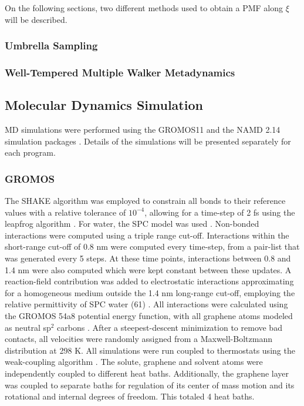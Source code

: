 \documentclass[twoside,twocolumn,9pt]{article}
\begin{document}
On the following sections, two different methods used to obtain a PMF along $\xi$ will be described.

\subsubsection{Umbrella Sampling}

\subsubsection{Well-Tempered Multiple Walker Metadynamics}

\subsection{Molecular Dynamics Simulation}

MD simulations were performed using the GROMOS11 \cite{Riniker_2011,
  Schmid_2012} and the NAMD 2.14 simulation packages
\cite{Phillips_2020}.  Details of the simulations will be presented
separately for each program.

\subsubsection{GROMOS}

The SHAKE algorithm \cite{Ryckaert_1977} was employed to constrain all
bonds to their reference values with a relative tolerance of
$10^{-4}$, allowing for a time-step of 2 fs using the leapfrog
algorithm \cite{Hockney_1977}.  For water, the SPC model was used
\cite{Berendsen_1981}.  Non-bonded interactions were computed using a
triple range cut-off. Interactions within the short-range cut-off of
0.8 nm were computed every time-step, from a pair-list that was
generated every 5 steps.  At these time points, interactions between
0.8 and 1.4 nm were also computed which were kept constant between
these updates.  A reaction-field contribution was added to
electrostatic interactions approximating for a homogeneous medium
outside the 1.4 nm long-range cut-off, employing the relative
permittivity of SPC water (61) \cite{Tironi_1995}. All interactions
were calculated using the GROMOS 54a8 potential energy function, with
all graphene atoms modeled as neutral sp$^2$ carbons \cite{Reif_2012}.
After a steepest-descent minimization to remove bad contacts, all
velocities were randomly assigned from a Maxwell-Boltzmann
distribution at 298 K.  All simulations were run coupled to
thermostats using the weak-coupling algorithm
\cite{Berendsen_1984}. The solute, graphene and solvent atoms were
independently coupled to different heat baths. Additionally, the
graphene layer was coupled to separate baths for regulation of its
center of mass motion and its rotational and internal degrees of
freedom. This totaled 4 heat baths.
\end{document}
